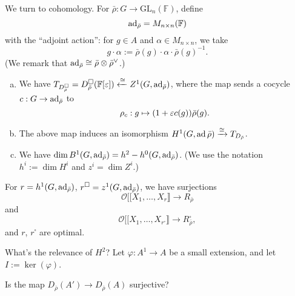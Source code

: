 \documentclass[reqno]{amsart} 
\begin{document}
We turn to cohomology.  For $\bar{\rho} : G \rightarrow \mathrm{GL}_n(\mathbb{F})$, define
\begin{equation*}
  \operatorname{ad}_{\bar{\rho}} = M_{n \times n}(\mathbb{F})
\end{equation*}
with the ``adjoint action'': for $g \in A$ and $\alpha \in M_{n \times n}$, we take
\begin{equation*}
  g \cdot \alpha := \bar{\rho}(g) \cdot \alpha \cdot \bar{\rho}(g)^{-1}.
\end{equation*}
(We remark that $\operatorname{ad}_{\bar{\rho}} \cong \bar{\rho} \otimes \bar{\rho}^\vee$.)
\begin{proposition}\label{proposition:cq6thpeed2}
  \begin{enumerate}[(a)]
  \item We have $T_{D_\rho^{\square}} = D_{\bar{\rho}}^{\square}(\mathbb{F}[\varepsilon]) \xleftarrow{\cong} Z^1(G, \operatorname{ad}_{\bar{\rho}})$, where the map sends a cocycle $c : G \rightarrow \operatorname{ad}_{\bar{\rho}}$ to
    \begin{equation*}
      \rho_c : g \mapsto(1 + \varepsilon c(g)) \bar{\rho}(g).
    \end{equation*}
  \item The above map induces an isomorphism $H^1(G, \operatorname{ad} \bar{\rho}) \xrightarrow{\cong} T_{D_{\bar{\rho}}}$.
  \item We have $\dim B^1(G, \operatorname{ad}_{\bar{\rho}}) = h^2 - h^0(G, \operatorname{ad}_{\bar{\rho}})$.  (We use the notation $h^i := \dim H^i$ and $z^i = \dim Z^i$.)
  \end{enumerate}
\end{proposition}
\begin{corollary}\label{corollary:cq6thpefo9}
  For $r = h^1(G, \operatorname{ad}_{\bar{\rho}})$, $r^{\square} = z^1(G, \operatorname{ad}_{\bar{\rho}})$, we have surjections
  \begin{equation*}
    \mathcal{O} [[ X_1, \dotsc, X_r \rrbracket \rightarrow R_{\bar{\rho}}
  \end{equation*}
  and
  \begin{equation*}
    \mathcal{O} [[ X_1, \dotsc, X_{r^{\square}} \rrbracket \rightarrow R_{\bar{\rho}}^{\square},
  \end{equation*}
  and $r$, $r^{\square}$ are optimal.
\end{corollary}
What's the relevance of $H^2$?  Let $\varphi : A^1 \rightarrow A$ be a small extension, and let $I := \ker(\varphi)$.
\begin{question}\label{question:cq6thpebye}
  Is the map $D_{\bar{\rho}}(A') \rightarrow D_{\bar{\rho}}(A)$ surjective?
\end{question}
\end{document}
